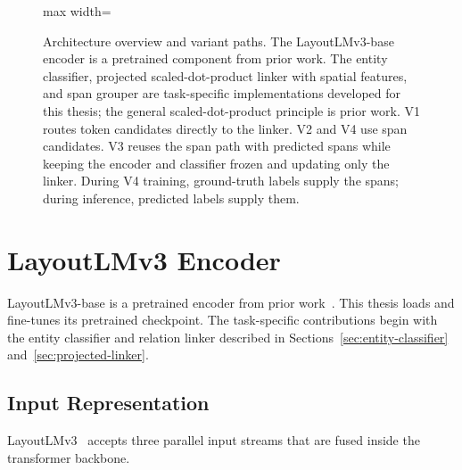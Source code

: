 \begin{figure}[ht]
\begin{adjustbox}{max width=\textwidth}
  \end{adjustbox}
  \caption{Architecture overview and variant paths. The LayoutLMv3-base encoder
    is a pretrained component from prior work. The entity classifier, projected
    scaled-dot-product linker with spatial features, and span grouper are
    task-specific implementations developed for this thesis; the general
    scaled-dot-product principle is prior work. V1 routes token candidates
    directly to the linker. V2 and V4 use span candidates. V3 reuses the span
    path with predicted spans while keeping the encoder and classifier frozen
    and updating only the linker. During V4 training, ground-truth labels supply
    the spans; during inference, predicted labels supply them.}
  \label{fig:architecture-overview}
\end{figure}

\section{LayoutLMv3 Encoder}
\label{sec:layoutlmv3-encoder}

LayoutLMv3-base is a pretrained encoder from prior work~\cite{layoutlmv3}.
This thesis loads and fine-tunes its pretrained checkpoint. The task-specific
contributions begin with the entity classifier and relation linker described in
Sections~\ref{sec:entity-classifier} and~\ref{sec:projected-linker}.

\subsection{Input Representation}
\label{sec:input-representation}

LayoutLMv3~\cite{layoutlmv3} accepts three parallel input streams that
are fused inside the transformer backbone.

